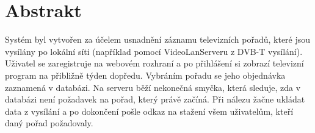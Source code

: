 \documentclass[11pt,twoside,a4paper]{dp_format}%
\begin{document}
\chapter*{Abstrakt}
Systém byl vytvořen za účelem usnadnění záznamu televizních pořadů, které jsou vysílány po lokální síti (například pomocí VideoLanServeru z DVB-T vysílání). Uživatel se zaregistruje na webovém rozhraní a po přihlášení si zobrazí televizní program na přibližně týden dopředu. Vybráním pořadu se jeho objednávka zaznamená v databázi. Na serveru běží nekonečná smyčka, která sleduje, zda v databázi není požadavek na pořad, který právě začíná. Při nálezu žačne ukládat data z vysílání a po dokončení pošle odkaz na stažení všem uživatelům, kteří daný pořad požadovaly.
\cleardoublepage%

\tableofcontents
\cleardoublepage%

\listoffigures
{}
\cleardoublepage%

\listoftables
{}
\cleardoublepage%

\mainbodystarts







\cleardoublepage




\cleardoublepage

\appendix

\cleardoublepage


\cleardoublepage


\cleardoublepage


\cleardoublepage


\cleardoublepage
\end{document}
